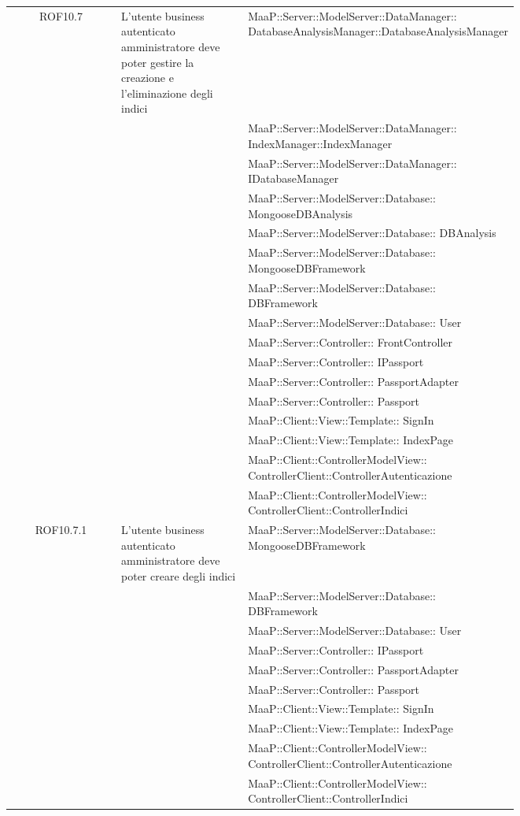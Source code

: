 \begin{center}
\begin{longtable}{|c|p{0.25\linewidth}|p{0.5\linewidth}|}
\midrule
ROF10.7
& L'utente business autenticato amministratore deve poter gestire la creazione e l'eliminazione degli indici
& MaaP::Server::ModelServer::DataManager:: DatabaseAnalysisManager::DatabaseAnalysisManager\\
& & MaaP::Server::ModelServer::DataManager:: IndexManager::IndexManager\\
& & MaaP::Server::ModelServer::DataManager:: IDatabaseManager\\
& & MaaP::Server::ModelServer::Database:: MongooseDBAnalysis\\
& & MaaP::Server::ModelServer::Database:: DBAnalysis\\
& & MaaP::Server::ModelServer::Database:: MongooseDBFramework\\
& & MaaP::Server::ModelServer::Database:: DBFramework\\
& & MaaP::Server::ModelServer::Database:: User\\
& & MaaP::Server::Controller:: FrontController\\
& & MaaP::Server::Controller:: IPassport\\
& & MaaP::Server::Controller:: PassportAdapter\\
& & MaaP::Server::Controller:: Passport\\
& & MaaP::Client::View::Template:: SignIn\\
& & MaaP::Client::View::Template:: IndexPage\\
& & MaaP::Client::ControllerModelView:: ControllerClient::ControllerAutenticazione\\
& & MaaP::Client::ControllerModelView:: ControllerClient::ControllerIndici\\

\midrule
ROF10.7.1
& L'utente business autenticato amministratore deve poter creare degli indici
& MaaP::Server::ModelServer::Database:: MongooseDBFramework\\
& & MaaP::Server::ModelServer::Database:: DBFramework\\
& & MaaP::Server::ModelServer::Database:: User\\
& & MaaP::Server::Controller:: IPassport\\
& & MaaP::Server::Controller:: PassportAdapter\\
& & MaaP::Server::Controller:: Passport\\
& & MaaP::Client::View::Template:: SignIn\\
& & MaaP::Client::View::Template:: IndexPage\\
& & MaaP::Client::ControllerModelView:: ControllerClient::ControllerAutenticazione\\
& & MaaP::Client::ControllerModelView:: ControllerClient::ControllerIndici\\


\end{longtable}
\end{center}
